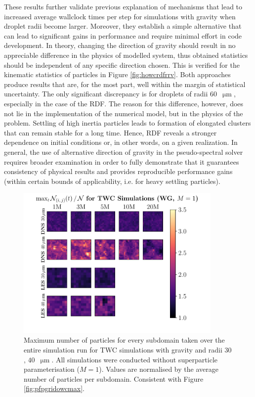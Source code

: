 \documentclass{pracamgren}
\begin{document}
These results further validate previous explanation of mechanisms that lead to increased average wallclock times per step for simulations with gravity when droplet radii become larger.
Moreover, they establish a simple alternative that can lead to significant gains in performance and require minimal effort in code development.
In theory, changing the direction of gravity should result in no appreciable difference in the physics of modelled system, thus obtained statistics should be independent of any specific direction chosen.
This is verified for the kinematic statistics of particles in Figure \ref{fig:howcrdfrrv}.
Both approaches produce results that are, for the most part, well within the margin of statistical uncertainty.
The only significant discrepancy is for droplets of radii $60$~$\upmu\text{m}$, especially in the case of the RDF.
The reason for this difference, however, does not lie in the implementation of the numerical model, but in the physics of the problem.
Settling of high inertia particles leads to formation of elongated clusters that can remain stable for a long time.
Hence, RDF reveals a stronger dependence on initial conditions or, in other words, on a given realization.
In general, the use of alternative direction of gravity in the pseudo-spectral solver requires broader examination in order to fully demonstrate that it guarantees consistency of physical results and provides reproducible performance gains (within certain bounds of applicability, i.e. for heavy settling particles).

\begin{figure}[!h]
\centering
\includegraphics[width=10cm]{img/plots/3-4i-pfpgridtwcmax.pdf}
\caption{
Maximum number of particles for every subdomain taken over the entire simulation run for TWC simulations with gravity and radii $30$, $40$~$\upmu\text{m}$.
All simulations were conducted without superparticle parameterisation ($M=1$). 
Values are normalised by the average number of particles per subdomain.
Consistent with Figure \ref{fig:pfpgridowcmax}.
}
\label{fig:pfpgridtwcmax}
\end{figure}
\end{document}
